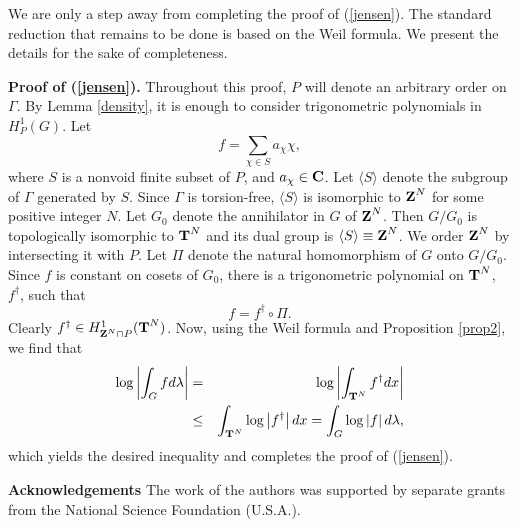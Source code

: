 We are only a step away from completing the proof of (\ref{jensen}).
The standard reduction that remains to be done
is based on the Weil formula.  We present the details for the sake of 
completeness.

{\bf Proof of (\ref{jensen}).}  
Throughout this proof, $P$ will denote an arbitrary order on 
$\Gamma$.  By Lemma \ref{density}, 
it is enough to consider 
trigonometric polynomials in $H^1_P(G)$.  Let
$$f=\sum_{\chi\in S}a_\chi \chi,$$
where $S$ is a nonvoid 
finite subset of $P$, and $a_\chi\in \C$.  
Let $\langle S \rangle$ denote the subgroup of $\Gamma$
generated by $S$.  Since $\Gamma$ is torsion-free,
$\langle S \rangle$ is isomorphic to $\Z^N$ for some positive integer $N$. 
Let $G_0$ denote the annihilator in $G$ of $\Z^N$.
Then $G/G_0$ is topologically isomorphic to $\T^N$
and its dual group is $\langle S \rangle\equiv \Z^N$.  We order
$\Z^N$ by intersecting it with $P$.
Let $\Pi$ denote the
natural homomorphism of $G$ onto 
$G/G_0$.
Since $f$ is constant on cosets of $G_0$,
there is a trigonometric polynomial on $\T^N$, $f^\dagger$,
such that
$$f=f^\dagger \circ \Pi.$$
Clearly $f^\dagger\in H^1_{\Z^N\cap P}(\T^N)$.
Now, using the Weil formula \cite[Theorem (28.54) (iii)]{hr2} 
and Proposition \ref{prop2},
we find that
\begin{eqnarray*}
\log\left|\int_G fd\lambda\right|
			&=&
\log\left|\int_{\T^N} f^\dagger dx\right| \\
			&\leq&
\int_{\T^N} \log\left|f^\dagger \right| dx
			=
\int_G \log\left|f \right| d\lambda,
\end{eqnarray*}
which yields the desired inequality and completes the proof of (\ref{jensen}).


{\bf Acknowledgements}  The work of the authors was supported
by separate grants from the National Science Foundation (U.S.A.).

